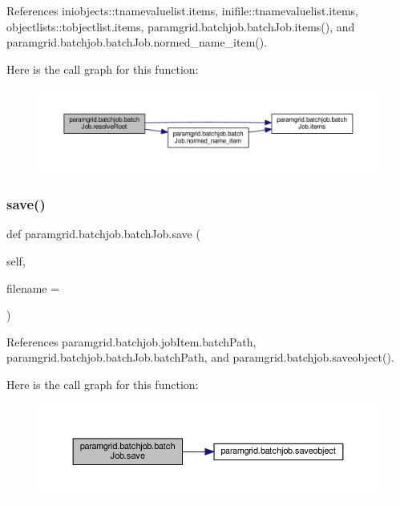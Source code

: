 References iniobjects\+::tnamevaluelist.\+items, inifile\+::tnamevaluelist.\+items, objectlists\+::tobjectlist.\+items, paramgrid.\+batchjob.\+batch\+Job.\+items(), and paramgrid.\+batchjob.\+batch\+Job.\+normed\+\_\+name\+\_\+item().

Here is the call graph for this function\+:
\nopagebreak
\begin{figure}[H]
\begin{center}
\leavevmode
\includegraphics[width=350pt]{classparamgrid_1_1batchjob_1_1batchJob_aa8a343f42f15d9546b5de3a46fbd53e1_cgraph}
\end{center}
\end{figure}
\mbox{\label{classparamgrid_1_1batchjob_1_1batchJob_af3737431072a9241a150256245c9bd0d}} 
\subsubsection{\texorpdfstring{save()}{save()}}
{\footnotesize\ttfamily def paramgrid.\+batchjob.\+batch\+Job.\+save (\begin{DoxyParamCaption}\item[{}]{self,  }\item[{}]{filename = {\ttfamily \textquotesingle{}\textquotesingle{}} }\end{DoxyParamCaption})}



References paramgrid.\+batchjob.\+job\+Item.\+batch\+Path, paramgrid.\+batchjob.\+batch\+Job.\+batch\+Path, and paramgrid.\+batchjob.\+saveobject().

Here is the call graph for this function\+:
\nopagebreak
\begin{figure}[H]
\begin{center}
\leavevmode
\includegraphics[width=350pt]{classparamgrid_1_1batchjob_1_1batchJob_af3737431072a9241a150256245c9bd0d_cgraph}
\end{center}
\end{figure}


